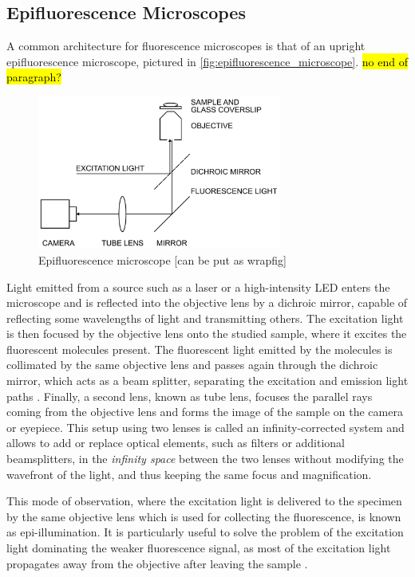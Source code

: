 \subsection{Epifluorescence Microscopes} \label{sec:epifluorescence_microscopes}
A common architecture for fluorescence microscopes is that of an upright epifluorescence microscope, pictured in \autoref{fig:epifluorescence_microscope}. \hl{no end of paragraph?}

\begin{figure}[htbp]  
    \centering
    \includegraphics[width=8cm]{figures/epifluorescence-microscope.png}
    \caption{Epifluorescence microscope \cite{douglass_notice_2023} [can be put as wrapfig]}
    \label{fig:epifluorescence_microscope}
\end{figure}

Light emitted from a source such as a laser or a high-intensity LED enters the microscope and is reflected into the objective lens by a dichroic mirror, capable of reflecting some wavelengths of light and transmitting others.
The excitation light is then focused by the objective lens onto the studied sample, where it excites the fluorescent molecules present.
The fluorescent light emitted by the molecules is collimated by the same objective lens and passes again through the dichroic mirror, which acts as a beam splitter, separating the excitation and emission light paths \cite{sachl_introduction_2022}.
Finally, a second lens, known as tube lens, focuses the parallel rays coming from the objective lens and forms the image of the sample on the camera or eyepiece.
This setup using two lenses is called an infinity-corrected system and allows to add or replace optical elements, such as filters or additional beamsplitters, in the \emph{infinity space} between the two lenses  without modifying the wavefront of the light, and thus keeping the same focus and magnification.

This mode of observation, where the excitation light is delivered to the specimen by the same objective lens which is used for collecting the fluorescence, is known as epi-illumination.
It is particularly useful to solve the problem of the excitation light dominating the weaker fluorescence signal, as most of the excitation light propagates away from the objective after leaving the sample \cite{douglass_notice_2023}.


